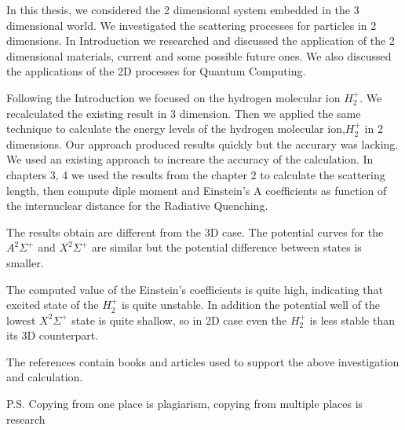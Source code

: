 
\label{conclusion}

In this thesis, we considered the 2 dimensional system embedded in the 3 dimensional world. We investigated the scattering processes for particles in 2 dimensions. In Introduction we researched and discussed the application of the 2 dimensional materials, current and some possible future ones. We also discussed the applications of the 2D processes for Quantum Computing.

Following the Introduction we focused on the hydrogen molecular ion $ H_2^{+} $. We recalculated the existing result in 3 dimension. 
Then we applied the same technique to calculate the energy levels of the hydrogen molecular ion,$ H_2^{+} $ in 2 dimensions. Our approach produced results quickly but the accurary was lacking. We used an existing approach to increare the accuracy of the calculation. In chapters 3, 4 we used the results from the chapter 2 to calculate the scattering length, then compute diple moment and Einstein's A coefficients as function of the internuclear distance for the Radiative Quenching.

The results obtain are different from the 3D case. The potential curves for the $ A^2\Sigma^+ $ and $X^2\Sigma^+ $ are similar but the potential difference between states is smaller. 

The computed value of the Einstein's coefficients is quite high, indicating that excited state of the $ H_2^{+} $ is quite unstable. In addition the potential well of the lowest $ X^2\Sigma^+ $ state is quite shallow, so in 2D case even the  $ H_2^{+} $ is less stable than its 3D counterpart.  

The references contain books and articles used to support the above investigation and calculation.

P.S.
Copying from one place is plagiarism, copying from multiple places is research


